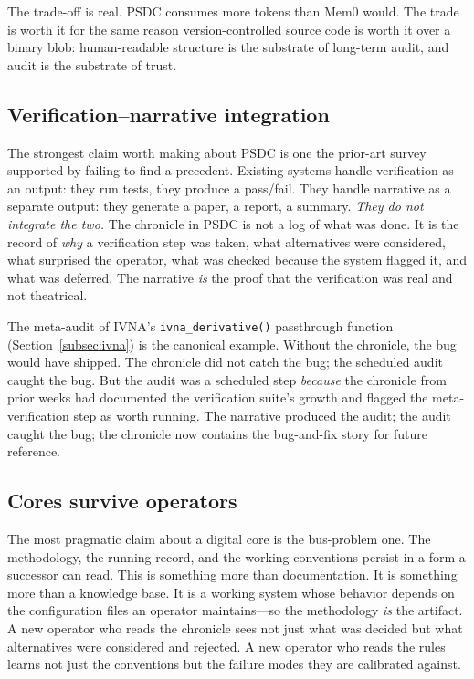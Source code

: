 \documentclass[12pt]{article}
\begin{document}
The trade-off is real. PSDC consumes more tokens than Mem0 would. The trade is worth it for the same reason version-controlled source code is worth it over a binary blob: human-readable structure is the substrate of long-term audit, and audit is the substrate of trust.

\subsection{Verification--narrative integration}
\label{subsec:vni}

The strongest claim worth making about PSDC is one the prior-art survey supported by failing to find a precedent. Existing systems handle verification as an output: they run tests, they produce a pass/fail. They handle narrative as a separate output: they generate a paper, a report, a summary. \emph{They do not integrate the two.} The chronicle in PSDC is not a log of what was done. It is the record of \emph{why} a verification step was taken, what alternatives were considered, what surprised the operator, what was checked because the system flagged it, and what was deferred. The narrative \emph{is} the proof that the verification was real and not theatrical.

The meta-audit of IVNA's \texttt{ivna\_derivative()} passthrough function (Section~\ref{subsec:ivna}) is the canonical example. Without the chronicle, the bug would have shipped. The chronicle did not catch the bug; the scheduled audit caught the bug. But the audit was a scheduled step \emph{because} the chronicle from prior weeks had documented the verification suite's growth and flagged the meta-verification step as worth running. The narrative produced the audit; the audit caught the bug; the chronicle now contains the bug-and-fix story for future reference.

\subsection{Cores survive operators}
\label{subsec:bus-problem}

The most pragmatic claim about a digital core is the bus-problem one. The methodology, the running record, and the working conventions persist in a form a successor can read. This is something more than documentation. It is something more than a knowledge base. It is a working system whose behavior depends on the configuration files an operator maintains---so the methodology \emph{is} the artifact. A new operator who reads the chronicle sees not just what was decided but what alternatives were considered and rejected. A new operator who reads the rules learns not just the conventions but the failure modes they are calibrated against.
\end{document}
